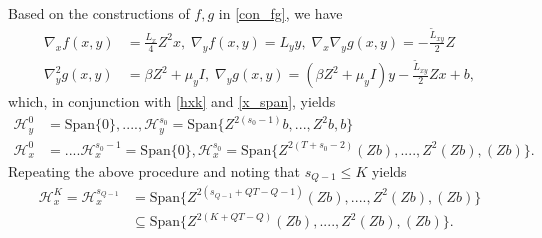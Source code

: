 \documentclass{osudissert96}
\begin{document}
Based on the constructions of $f,g$ in \cref{con_fg}, we have 
\begin{align*}
\nabla_x f(x,y) &= \frac{L_x}{4} Z^2x,\;  \nabla_y f(x,y) = L_y y, \;\nabla_x\nabla_y g(x,y) = -\frac{\widetilde L_{xy}}{2} Z 
\nonumber
\\ \nabla_y^2g(x,y) &= \beta Z^2 +\mu_y I, \; \nabla_y g(x,y) = (\beta Z^2 + \mu_y I) y - \frac{\widetilde L_{xy}}{2} Zx + b, 
\end{align*}
which, in conjunction with \cref{hxk} and \cref{x_span}, yields 
\begin{align*}
\mathcal{H}_y^0 &= \mbox{Span}\{0\}, ...., \mathcal{H}_y^{s_0} = \mbox{Span}\{Z^{2(s_0-1)}b,...,Z^2b,b\} \nonumber
\\\mathcal{H}_x^0 &= .... \mathcal{H}_x^{s_0-1} =\mbox{Span}\{0\}, \mathcal{H}_x^{s_0} =\mbox{Span}\{Z^{2(T+s_0-2)}(Zb),....,Z^2(Zb),(Zb)\}. 
\end{align*}
Repeating the above procedure and noting that $s_{Q-1}\leq K$ yields
\begin{align}\label{eq:subsscas} 
\mathcal{H}_x^K = \mathcal{H}_x^{s_{Q-1}} &=  \mbox{Span}\{Z^{2(s_{Q-1}+QT-Q-1)}(Zb),....,Z^2(Zb),(Zb)\}\nonumber
\\&\subseteq \mbox{Span}\{Z^{2(K+QT-Q)}(Zb),....,Z^2(Zb),(Zb)\}. 
\end{align}

\vspace{0.2cm}
\end{document}
